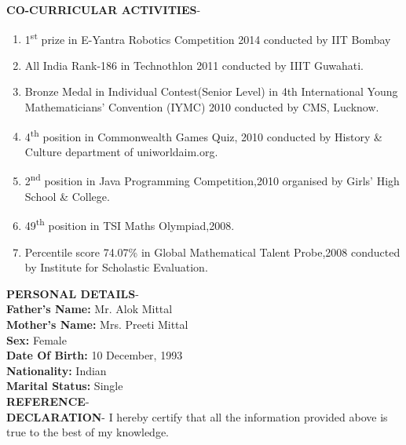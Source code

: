 \documentclass{article}
\begin{document}
	\textbf{CO-CURRICULAR ACTIVITIES}-
	\begin{enumerate}
		\item 1\textsuperscript{st} prize in E-Yantra Robotics Competition 2014 conducted by IIT Bombay
		\item All India Rank-186 in Technothlon 2011 conducted by IIIT Guwahati.
		\item Bronze Medal in Individual Contest(Senior Level) in 4th International Young Mathematicians' Convention (IYMC) 2010 conducted by CMS, Lucknow.
		\item 4\textsuperscript{th} position in Commonwealth Games Quiz, 2010 conducted by History & Culture department of uniworldaim.org.
		\item 2\textsuperscript{nd} position in Java Programming Competition,2010 organised by Girls' High School \& College.
		\item 49\textsuperscript{th} position in TSI Maths Olympiad,2008.
		\item Percentile score 74.07\% in Global Mathematical Talent Probe,2008 conducted by Institute for Scholastic Evaluation.\\[\baselineskip]
	\end{enumerate}
	\textbf{PERSONAL DETAILS}- \\
	\textbf{Father's Name:} Mr. Alok Mittal\\
	\textbf{Mother's Name:} Mrs. Preeti Mittal\\
	\textbf{Sex:} Female\\
	\textbf{Date Of Birth:} 10 December, 1993\\
	\textbf{Nationality:} Indian\\
	\textbf{Marital Status:} Single\\[\baselineskip]
	\textbf{REFERENCE}-
	\\[\baselineskip]
	\textbf{DECLARATION}- I hereby certify that all the information provided above is true to the best of my knowledge.
	
\end{document}
